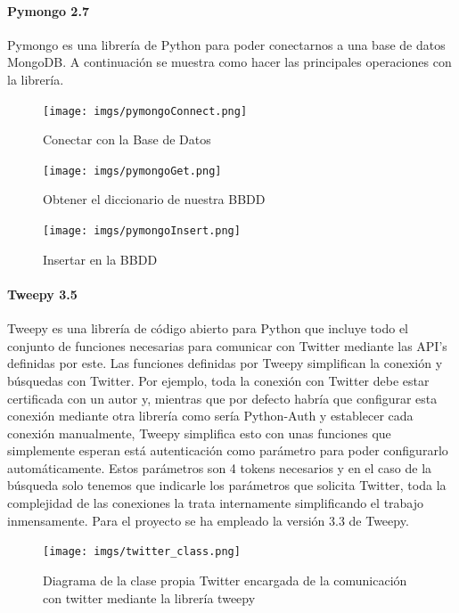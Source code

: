 \documentclass[../all.tex]{subfiles}
\begin{document}
       	\paragraph{Pymongo 2.7}
       		Pymongo es una librería de Python para poder conectarnos a una base de datos MongoDB. A continuación se muestra como hacer las principales operaciones con la librería\cite{PyMongo}.\\
       		\begin{figure}[H]
       			\centering
       			\texttt{[image: imgs/pymongoConnect.png]}
       			\caption{Conectar con la Base de Datos}
       		\end{figure}
	       	\begin{figure}[H]
	       		\centering
	       		\texttt{[image: imgs/pymongoGet.png]}
	       		\caption{Obtener el diccionario de nuestra BBDD}
	       	\end{figure}
	       \begin{figure}[H]
	       	\centering
	       	\texttt{[image: imgs/pymongoInsert.png]}
	       	\caption{Insertar en la BBDD}
	       \end{figure}
       
       \newpage
       \paragraph{Tweepy 3.5}
            Tweepy es una librería de código abierto para Python que incluye todo el conjunto de funciones necesarias para comunicar con Twitter mediante las API's definidas por este. Las funciones definidas por Tweepy simplifican la conexión y búsquedas con Twitter. Por ejemplo, toda la conexión con Twitter debe estar certificada con un autor y, mientras que por defecto habría que configurar esta conexión mediante otra librería como sería Python-Auth y establecer cada conexión manualmente, Tweepy simplifica esto con unas funciones que simplemente esperan está autenticación como parámetro para poder configurarlo automáticamente. Estos parámetros son 4 tokens necesarios y en el caso de la búsqueda solo tenemos que indicarle los parámetros que solicita Twitter, toda la complejidad de las conexiones la trata internamente simplificando el trabajo inmensamente. Para el proyecto se ha empleado la versión 3.3 de Tweepy\cite{Tweepy}.
            \begin{figure}[H]
            	\centering
            	\texttt{[image: imgs/twitter\_class.png]}
            	\caption{Diagrama de la clase propia Twitter encargada de la comunicación con twitter mediante la librería tweepy}
            \end{figure}
        
\end{document}
